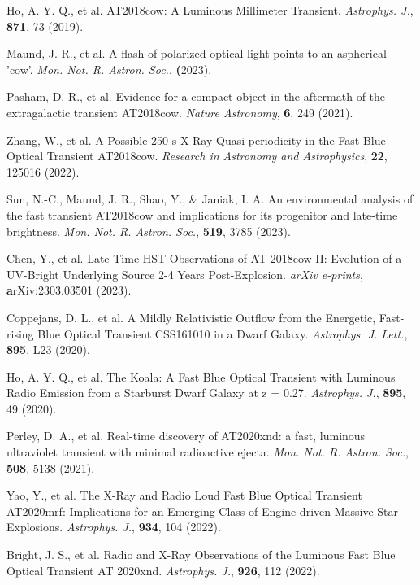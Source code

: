\documentclass{nature_plusfigure}
\newcommand{\mn}{{Mon. Not. R. Astron. Soc.}}
\newcommand{\mnras}{\mn}
\newcommand{\apj}{{Astrophys. J.}}
\newcommand{\apjl}{{Astrophys. J. Lett.}}
\begin{document}
\begin{thebibliography}{100}

 Ho, A. Y. Q., et al. AT2018cow: A Luminous Millimeter Transient. \emph{\apj}, \textbf{871}, 73 (2019). 

 Maund, J. R., et al. A flash of polarized optical light points to an aspherical 'cow'. \emph{\mnras}, \textbf (2023). 

 Pasham, D. R., et al. Evidence for a compact object in the aftermath of the extragalactic transient AT2018cow. \emph{Nature Astronomy}, \textbf{6}, 249 (2021). 

 Zhang, W., et al. A Possible 250 s X-Ray Quasi-periodicity in the Fast Blue Optical Transient AT2018cow. \emph{Research in Astronomy and Astrophysics}, \textbf{22}, 125016 (2022). 

 Sun, N.-C., Maund, J. R., Shao, Y., \& Janiak, I. A. An environmental analysis of the fast transient AT2018cow and implications for its progenitor and late-time brightness. \emph{\mnras}, \textbf{519}, 3785 (2023). 

 Chen, Y., et al. Late-Time HST Observations of AT 2018cow II: Evolution of a UV-Bright Underlying Source 2-4 Years Post-Explosion. \emph{arXiv e-prints}, \textbf arXiv:2303.03501 (2023). 


 Coppejans, D. L., et al. A Mildly Relativistic Outflow from the Energetic, Fast-rising Blue Optical Transient CSS161010 in a Dwarf Galaxy. \emph{\apjl}, \textbf{895}, L23 (2020). 

 Ho, A. Y. Q., et al. The Koala: A Fast Blue Optical Transient with Luminous Radio Emission from a Starburst Dwarf Galaxy at z = 0.27. \emph{\apj}, \textbf{895}, 49 (2020). 

 Perley, D. A., et al. Real-time discovery of AT2020xnd: a fast, luminous ultraviolet transient with minimal radioactive ejecta. \emph{\mnras}, \textbf{508}, 5138 (2021). 

 Yao, Y., et al. The X-Ray and Radio Loud Fast Blue Optical Transient AT2020mrf: Implications for an Emerging Class of Engine-driven Massive Star Explosions. \emph{\apj}, \textbf{934}, 104 (2022). 

  Bright, J. S., et al. Radio and X-Ray Observations of the Luminous Fast Blue Optical Transient AT 2020xnd. \emph{\apj}, \textbf{926}, 112 (2022). 


\end{thebibliography}
\end{document}
